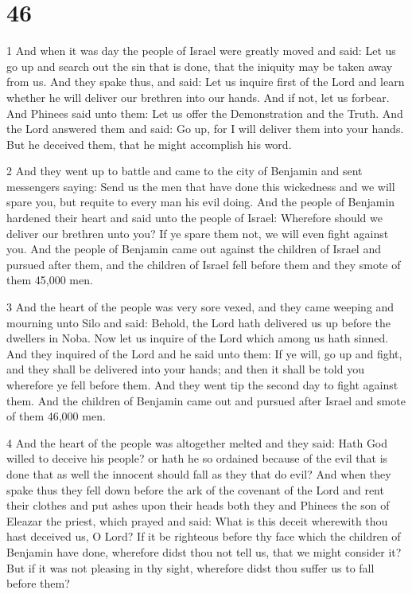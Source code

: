 \chapter{46}

\par 1 And when it was day the people of Israel were greatly moved and said: Let us go up and search out the sin that is done, that the iniquity may be taken away from us. And they spake thus, and said: Let us inquire first of the Lord and learn whether he will deliver our brethren into our hands. And if not, let us forbear. And Phinees said unto them: Let us offer the Demonstration and the Truth. And the Lord answered them and said: Go up, for I will deliver them into your hands. But he deceived them, that he might accomplish his word.

\par 2 And they went up to battle and came to the city of Benjamin and sent messengers saying: Send us the men that have done this wickedness and we will spare you, but requite to every man his evil doing. And the people of Benjamin hardened their heart and said unto the people of Israel: Wherefore should we deliver our brethren unto you? If ye spare them not, we will even fight against you. And the people of Benjamin came out against the children of Israel and pursued after them, and the children of Israel fell before them and they smote of them 45,000 men. 

\par 3 And the heart of the people was very sore vexed, and they came weeping and mourning unto Silo and said: Behold, the Lord hath delivered us up before the dwellers in Noba. Now let us inquire of the Lord which among us hath sinned. And they inquired of the Lord and he said unto them: If ye will, go up and fight, and they shall be delivered into your hands; and then it shall be told you wherefore ye fell before them. And they went tip the second day to fight against them. And the children of Benjamin came out and pursued after Israel and smote of them 46,000 men. 

\par 4 And the heart of the people was altogether melted and they said: Hath God willed to deceive his people? or hath he so ordained because of the evil that is done that as well the innocent should fall as they that do evil? And when they spake thus they fell down before the ark of the covenant of the Lord and rent their clothes and put ashes upon their heads both they and Phinees the son of Eleazar the priest, which prayed and said: What is this deceit wherewith thou hast deceived us, O Lord? If it be righteous before thy face which the children of Benjamin have done, wherefore didst thou not tell us, that we might consider it? But if it was not pleasing in thy sight, wherefore didst thou suffer us to fall before them?



